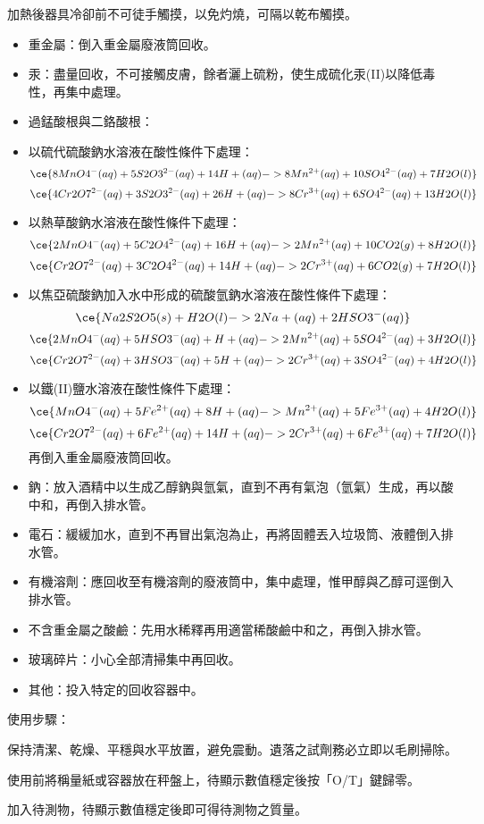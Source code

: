 \documentclass[a4paper,12pt]{article}
\begin{document}
\item 加熱後器具冷卻前不可徒手觸摸，以免灼燒，可隔以乾布觸摸。
\eit
{}
\begin{itemize}
\item 重金屬：倒入重金屬廢液筒回收。
\item 汞：盡量回收，不可接觸皮膚，餘者灑上硫粉，使生成硫化汞(II)以降低毒性，再集中處理。
\item 過錳酸根與二鉻酸根：
\bit
\item 以硫代硫酸鈉水溶液在酸性條件下處理：
\[\ce{8MnO4^-(aq) + 5S2O3^{2-}(aq) + 14H+(aq) -> 8Mn^{2+}(aq) + 10SO4^{2-}(aq) + 7H2O(l)}\]
\[\ce{4Cr2O7^{2-}(aq) + 3S2O3^{2-}(aq) + 26H+(aq) -> 8Cr^{3+}(aq) + 6SO4^{2-}(aq) + 13H2O(l)}\]
\item 以熱草酸鈉水溶液在酸性條件下處理：
\[\ce{2MnO4^-(aq) + 5C2O4^{2-}(aq) + 16H+(aq) -> 2Mn^{2+}(aq) + 10CO2(g) + 8H2O(l)}\]
\[\ce{Cr2O7^{2-}(aq) + 3C2O4^{2-}(aq) + 14H+(aq) -> 2Cr^{3+}(aq) + 6CO2(g) + 7H2O(l)}\]
\item 以焦亞硫酸鈉加入水中形成的硫酸氫鈉水溶液在酸性條件下處理：
\[\ce{Na2S2O5(s) + H2O(l) -> 2Na+(aq) + 2HSO3^-(aq)}\]
\[\ce{2MnO4^-(aq) + 5HSO3^-(aq) + H+(aq) -> 2Mn^{2+}(aq) + 5SO4^{2-}(aq) + 3H2O(l)}\]
\[\ce{Cr2O7^{2-}(aq) + 3HSO3^-(aq) + 5H+(aq) -> 2Cr^{3+}(aq) + 3SO4^{2-}(aq) + 4H2O(l)}\]
\item 以鐵(II)鹽水溶液在酸性條件下處理：
\[\ce{MnO4^-(aq) + 5Fe^{2+}(aq) + 8H+(aq) -> Mn^{2+}(aq) + 5Fe^{3+}(aq) + 4H2O(l)}\]
\[\ce{Cr2O7^{2-}(aq) + 6Fe^{2+}(aq) + 14H+(aq) -> 2Cr^{3+}(aq) + 6Fe^{3+}(aq) + 7H2O(l)}\]
\eit
再倒入重金屬廢液筒回收。
\item 鈉：放入酒精中以生成乙醇鈉與氫氣，直到不再有氣泡（氫氣）生成，再以酸中和，再倒入排水管。
\item 電石：緩緩加水，直到不再冒出氣泡為止，再將固體丟入垃圾筒、液體倒入排水管。
\item 有機溶劑：應回收至有機溶劑的廢液筒中，集中處理，惟甲醇與乙醇可逕倒入排水管。
\item 不含重金屬之酸鹼：先用水稀釋再用適當稀酸鹼中和之，再倒入排水管。
\item 玻璃碎片：小心全部清掃集中再回收。
\item 其他：投入特定的回收容器中。
\end{itemize}
使用步驟：
\ben
\item 保持清潔、乾燥、平穩與水平放置，避免震動。遺落之試劑務必立即以毛刷掃除。
\item 使用前將稱量紙或容器放在秤盤上，待顯示數值穩定後按「O/T」鍵歸零。
\item 加入待測物，待顯示數值穩定後即可得待測物之質量。
\end{document}

